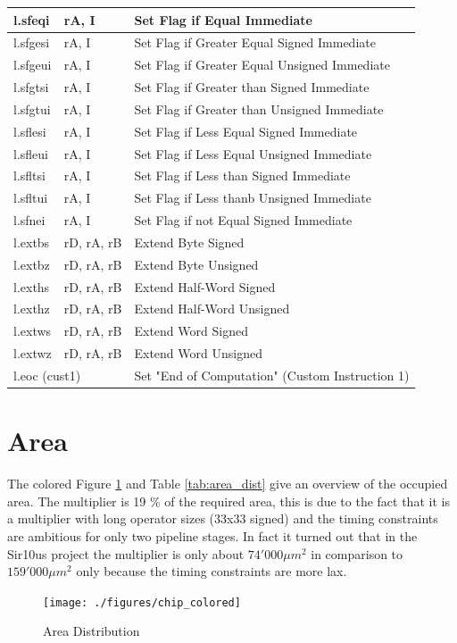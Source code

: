 \begin{longtable}{|p{1.8cm}|l|p{10cm}|}
l.sfeqi&rA, I&Set Flag if Equal Immediate\\ \hline
l.sfgesi&rA, I&Set Flag if Greater Equal Signed Immediate\\ \hline
l.sfgeui&rA, I&Set Flag if Greater Equal Unsigned Immediate\\ \hline
l.sfgtsi&rA, I&Set Flag if Greater than Signed Immediate\\ \hline
l.sfgtui&rA, I&Set Flag if Greater than Unsigned Immediate\\ \hline
l.sflesi&rA, I&Set Flag if Less Equal Signed Immediate\\ \hline
l.sfleui&rA, I&Set Flag if Less Equal Unsigned Immediate\\ \hline
l.sfltsi&rA, I&Set Flag if Less than Signed Immediate\\ \hline
l.sfltui&rA, I&Set Flag if Less thanb Unsigned Immediate\\ \hline
l.sfnei&rA, I&Set Flag if not Equal Signed Immediate\\ \hline \hline

l.extbs&rD, rA, rB&Extend Byte Signed\\ \hline
l.extbz&rD, rA, rB&Extend Byte Unsigned\\ \hline
l.exths&rD, rA, rB&Extend Half-Word Signed\\ \hline
l.exthz&rD, rA, rB&Extend Half-Word Unsigned\\ \hline
l.extws&rD, rA, rB&Extend Word Signed\\ \hline
l.extwz&rD, rA, rB&Extend Word Unsigned\\ \hline \hline

\multicolumn{2}{|l|}{l.eoc (cust1)}& Set "End of Computation" (Custom Instruction 1) \\ \hline

\end{longtable}

\section{Area}
\label{sec:area}
The colored Figure \ref{fig:chip_area} and Table \ref{tab:area_dist} give an overview of the occupied area. The multiplier is 19 \% of the required area, this is due to the fact that it is a multiplier with long operator sizes (33x33 signed) and the timing constraints are ambitious for only two pipeline stages. In fact it turned out that in the Sir10us project the multiplier is only about $74'000 \mu m^2$ in comparison to $159'000 \mu m^2$ only because the timing constraints are more lax.
\begin{figure}[htbp]
  \centering
  \texttt{[image: ./figures/chip\_colored]}
  \caption{Area Distribution}
  \label{fig:chip_area}
\end{figure}

